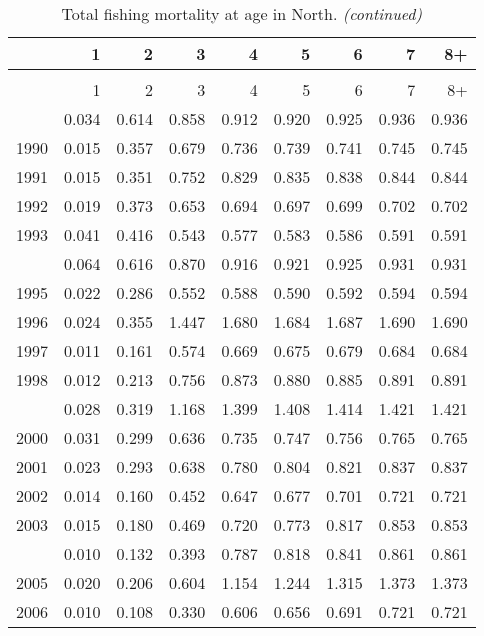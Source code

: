 \documentclass[
]{article}
\begin{document}
\begin{longtable}[t]{lrrrrrrrr}
\caption{\label{tab:North-region-FAA-table}Total fishing mortality at age in North.}\\
\toprule
  & 1 & 2 & 3 & 4 & 5 & 6 & 7 & 8+\\
\midrule
\endfirsthead
\caption[]{Total fishing mortality at age in North. \textit{(continued)}}\\
\toprule
  & 1 & 2 & 3 & 4 & 5 & 6 & 7 & 8+\\
\midrule
\endhead

\endfoot
\bottomrule
\endlastfoot
1989 & 0.034 & 0.614 & 0.858 & 0.912 & 0.920 & 0.925 & 0.936 & 0.936\\
1990 & 0.015 & 0.357 & 0.679 & 0.736 & 0.739 & 0.741 & 0.745 & 0.745\\
1991 & 0.015 & 0.351 & 0.752 & 0.829 & 0.835 & 0.838 & 0.844 & 0.844\\
1992 & 0.019 & 0.373 & 0.653 & 0.694 & 0.697 & 0.699 & 0.702 & 0.702\\
1993 & 0.041 & 0.416 & 0.543 & 0.577 & 0.583 & 0.586 & 0.591 & 0.591\\
\addlinespace
1994 & 0.064 & 0.616 & 0.870 & 0.916 & 0.921 & 0.925 & 0.931 & 0.931\\
1995 & 0.022 & 0.286 & 0.552 & 0.588 & 0.590 & 0.592 & 0.594 & 0.594\\
1996 & 0.024 & 0.355 & 1.447 & 1.680 & 1.684 & 1.687 & 1.690 & 1.690\\
1997 & 0.011 & 0.161 & 0.574 & 0.669 & 0.675 & 0.679 & 0.684 & 0.684\\
1998 & 0.012 & 0.213 & 0.756 & 0.873 & 0.880 & 0.885 & 0.891 & 0.891\\
\addlinespace
1999 & 0.028 & 0.319 & 1.168 & 1.399 & 1.408 & 1.414 & 1.421 & 1.421\\
2000 & 0.031 & 0.299 & 0.636 & 0.735 & 0.747 & 0.756 & 0.765 & 0.765\\
2001 & 0.023 & 0.293 & 0.638 & 0.780 & 0.804 & 0.821 & 0.837 & 0.837\\
2002 & 0.014 & 0.160 & 0.452 & 0.647 & 0.677 & 0.701 & 0.721 & 0.721\\
2003 & 0.015 & 0.180 & 0.469 & 0.720 & 0.773 & 0.817 & 0.853 & 0.853\\
\addlinespace
2004 & 0.010 & 0.132 & 0.393 & 0.787 & 0.818 & 0.841 & 0.861 & 0.861\\
2005 & 0.020 & 0.206 & 0.604 & 1.154 & 1.244 & 1.315 & 1.373 & 1.373\\
2006 & 0.010 & 0.108 & 0.330 & 0.606 & 0.656 & 0.691 & 0.721 & 0.721\\

\end{longtable}
\end{document}
